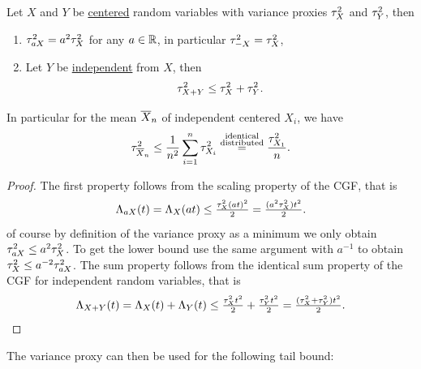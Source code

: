 \begin{lemma}
    \label{lem: properties of variance proxy}
    Let \(X\) and \(Y\) be \underline{centered} random variables with variance proxies \(\tau^2_{X}\) and \(\tau^2_{Y}\), then
    \begin{enumerate}[label=(\roman*), noitemsep]
        \item\label{it: var proxy scaling} \(\tau^2_{a X} = a^2 \tau^2_{X}\) for any \(a\in \mathbb{R}\), in particular \(\tau^2_{-X} = \tau^2_{X}\),
        \item\label{it: variance proxy independent sums} Let \(Y\) be \underline{independent} from \(X\), then
        \[
            \tau^2_{X+Y} \le \tau^2_{X} + \tau^2_{Y}.
        \]
    \end{enumerate}
    In particular for the mean \(\overline{X}_n\) of independent centered \(X_i\),
    we have
    \begin{equation}
        \label{eq: variance proxy of the mean}
        \tau^2_{\overline{X}_n} \le \frac1{n^2} \sum_{i=1}^n \tau^2_{X_i}
        \overset{\substack{\text{identical}\\\text{distributed}}}= \frac{\tau^2_{X_1}}n.
    \end{equation}
\end{lemma}
\begin{proof}
    The first property follows from the scaling property of the CGF, that is
    \[
        \Lambda_{a X}(t) = \Lambda_X(a t) \le \tfrac{\tau^2_{X} (a t)^2}2 = \tfrac{(a^2 \tau^2_{X}) t^2}2.
    \]
    of course by definition of the variance proxy as a minimum we only obtain
    \(\tau^2_{aX} \le a^2 \tau^2_{X}\). To get the lower bound use the same
    argument with \(a^{-1}\) to obtain \(\tau^2_{X} \le a^{-2} \tau^2_{aX}\).
    The sum property follows from the identical
    sum property of the CGF for independent random variables, that is
    \[
        \Lambda_{X+Y}(t) = \Lambda_X(t) + \Lambda_Y(t) \le \tfrac{\tau^2_{X} t^2}2 + \tfrac{\tau^2_{Y} t^2}2 = \tfrac{(\tau^2_{X} + \tau^2_{Y}) t^2}2.
        \qedhere
    \]

\end{proof}

The variance proxy can then be used for the following tail bound:

